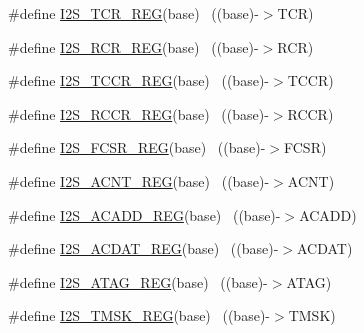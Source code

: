 \begin{DoxyCompactItemize}
\item 
\#define \hyperlink{group___i2_s___register___accessor___macros_ga392f415563b82de4e5160dce71206db6}{I2\+S\+\_\+\+T\+C\+R\+\_\+\+R\+EG}(base)                                            ~((base)-\/$>$T\+CR)
\item 
\#define \hyperlink{group___i2_s___register___accessor___macros_ga05764700fa267bd1aee8c1302dba5b3a}{I2\+S\+\_\+\+R\+C\+R\+\_\+\+R\+EG}(base)                                            ~((base)-\/$>$R\+CR)
\item 
\#define \hyperlink{group___i2_s___register___accessor___macros_ga536ad561a1b3adc079c79e07ebcf00d1}{I2\+S\+\_\+\+T\+C\+C\+R\+\_\+\+R\+EG}(base)                                          ~((base)-\/$>$T\+C\+CR)
\item 
\#define \hyperlink{group___i2_s___register___accessor___macros_ga756be9569f7687d899be073f4b5f3d58}{I2\+S\+\_\+\+R\+C\+C\+R\+\_\+\+R\+EG}(base)                                          ~((base)-\/$>$R\+C\+CR)
\item 
\#define \hyperlink{group___i2_s___register___accessor___macros_gae99037b06bfb699d2fab5d5969255a93}{I2\+S\+\_\+\+F\+C\+S\+R\+\_\+\+R\+EG}(base)                                          ~((base)-\/$>$F\+C\+SR)
\item 
\#define \hyperlink{group___i2_s___register___accessor___macros_ga65975667cd8838f77766c70f0e8ae976}{I2\+S\+\_\+\+A\+C\+N\+T\+\_\+\+R\+EG}(base)                                          ~((base)-\/$>$A\+C\+NT)
\item 
\#define \hyperlink{group___i2_s___register___accessor___macros_ga7d49b03b38f1c9a45fe564feb24da5f4}{I2\+S\+\_\+\+A\+C\+A\+D\+D\+\_\+\+R\+EG}(base)                                        ~((base)-\/$>$A\+C\+A\+DD)
\item 
\#define \hyperlink{group___i2_s___register___accessor___macros_gaa38942373c59e0d4e11f8390267128e6}{I2\+S\+\_\+\+A\+C\+D\+A\+T\+\_\+\+R\+EG}(base)                                        ~((base)-\/$>$A\+C\+D\+AT)
\item 
\#define \hyperlink{group___i2_s___register___accessor___macros_ga113d6278c37c567efb421e78e24483c0}{I2\+S\+\_\+\+A\+T\+A\+G\+\_\+\+R\+EG}(base)                                          ~((base)-\/$>$A\+T\+AG)
\item 
\#define \hyperlink{group___i2_s___register___accessor___macros_gac9c6731e0ebec84a54f913b841b9e059}{I2\+S\+\_\+\+T\+M\+S\+K\+\_\+\+R\+EG}(base)                                          ~((base)-\/$>$T\+M\+SK)
\item 

\end{DoxyCompactItemize}
